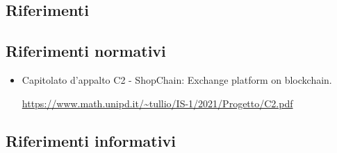 \subsection{Riferimenti}
\subsection{Riferimenti normativi}
\begin{itemize}
    \item Capitolato d'appalto C2 - ShopChain: Exchange platform on blockchain.
    \begin{center}
       \url{https://www.math.unipd.it/~tullio/IS-1/2021/Progetto/C2.pdf}
    \end{center} 
\end{itemize}

\subsection{Riferimenti informativi}
